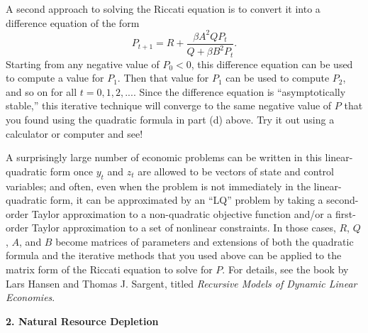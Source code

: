 \documentclass[12pt]{article}
\begin{document}
A second approach to solving the Riccati equation is to convert it into a difference equation of the form
$$
P_{t+1} = R + \frac{\beta A^{2}QP_{t}}{Q+\beta B^{2} P_{t}}.
$$
Starting from any negative value of $P_{0}<0$, this difference equation can be used to compute a value for $P_{1}$. Then that value for $P_{1}$ can be used to compute $P_{2}$, and so on for all $t=0,1,2,...$. Since the difference equation is ``asymptotically stable,'' this iterative technique will converge to the same negative value of $P$ that you found using the quadratic formula in part (d) above. Try it out using a calculator or computer and see!

A surprisingly large number of economic problems can be written in this linear-quadratic form once $y_{t}$ and $z_{t}$ are allowed to be vectors of state and control variables; and often, even when the problem is not immediately in the linear-quadratic form, it can be approximated by an ``LQ'' problem by taking a second-order Taylor approximation to a non-quadratic objective function and/or a first-order Taylor approximation to a set of nonlinear constraints. In those cases, $R$, $Q$, $A$, and $B$ become matrices of parameters and extensions of both the quadratic formula and the iterative methods that you used above can be applied to the matrix form of the Riccati equation to solve for $P$. For details, see the book by Lars Hansen and Thomas J. Sargent, titled \emph{Recursive Models of Dynamic Linear Economies}.

{\bfseries 2. Natural Resource Depletion}
\end{document}
